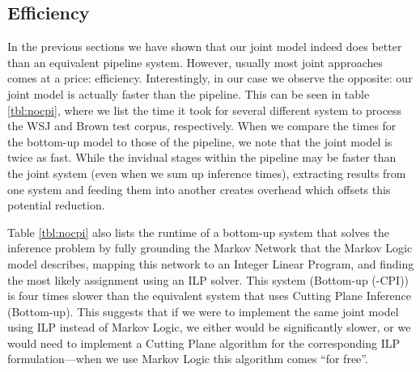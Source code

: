 \subsection{Efficiency}
In the previous sections we have shown that our joint model indeed does better than an equivalent pipeline system. However, usually most joint approaches comes at a price: efficiency. Interestingly, in our case we observe the opposite: our joint model is actually faster than the pipeline. This can be seen in table \ref{tbl:nocpi}, where we list the time it took for several different system to process the WSJ and Brown test corpus, respectively. When we compare the times for the bottom-up model to those of the pipeline, we note that the joint model is twice as fast. While the invidual stages within the pipeline may be faster than the joint system (even when we sum up inference times), extracting results from one system and feeding them into another creates overhead which offsets this potential reduction.  

Table \ref{tbl:nocpi} also lists the runtime of a bottom-up system that solves the inference problem by fully grounding the Markov Network that the Markov Logic model describes, mapping this network to an Integer Linear Program, and finding the most likely assignment using an ILP solver. This system (Bottom-up (-CPI)) is four times slower than the equivalent system that uses Cutting Plane Inference  (Bottom-up). This suggests that if we were to implement the same joint model using ILP instead of Markov Logic, we either would be significantly slower, or we would need to implement a Cutting Plane algorithm for the corresponding ILP formulation---when we use Markov Logic this algorithm comes ``for free''. 


